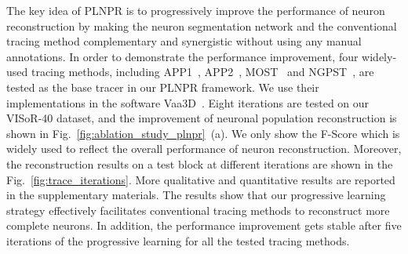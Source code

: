 The key idea of PLNPR is to progressively improve the performance of neuron reconstruction by making the neuron segmentation network and the conventional tracing method complementary and synergistic without using any manual annotations.
In order to demonstrate the performance improvement, four widely-used tracing methods, including APP1~\cite{Peng2011}, APP2~\cite{Xiao2013}, MOST~\cite{Wu2014} and NGPST~\cite{Quan2015}, are tested as the base tracer in our PLNPR framework. 
We use their implementations in the software Vaa3D~\cite{Peng2014}. 
%
Eight iterations are tested on our VISoR-40 dataset, and the improvement of neuronal population reconstruction is shown in Fig.~\ref{fig:ablation_study_plnpr}~(a).
We only show the F-Score which is widely used to reflect the overall performance of neuron reconstruction.
%
Moreover, the reconstruction results on a test block at different iterations are shown in the Fig.~\ref{fig:trace_iterations}.
%
More qualitative and quantitative results are reported in the supplementary materials.
The results show that our progressive learning strategy effectively facilitates conventional tracing methods to reconstruct more complete neurons.
In addition, the performance improvement gets stable after five iterations of the progressive learning for all the tested tracing methods. 

